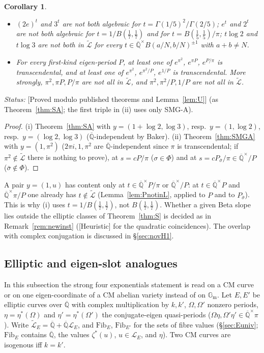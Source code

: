 \documentclass[11pt]{amsart}
\newtheorem{corollary}[theorem]{Corollary}
\theoremstyle{definition}
\newcommand{\Qb}{\overline{\mathbb{Q}}}
\newcommand{\Gm}{\mathbb{G}_{\mathrm m}}
\newcommand{\Lg}{\mathcal{L}}
\newcommand{\Lt}{\widetilde{\mathcal{L}}}
\newcommand{\Fib}{\mathrm{Fib}}
\newcommand{\lab}[1]{\textup{[#1]}}
\newcommand{\LabC}{\lab{Proved modulo published theorems and Lemma~\ref{lem:U}}}
\newcommand{\Status}{\noindent\emph{Status:} }
\begin{document}
\begin{corollary}\label{cor:SA}
\begin{itemize}
\item[(i)] $(2e)^t$ and $3^t$ are not both algebraic for $t=\Gamma(1/5)^2/\Gamma(2/5)$; $e^t$ and $2^t$ are not both
algebraic for $t=1/B(\frac17,\frac17)$ and for $t=B(\frac15,\frac15)/\pi$; $t\log2$ and $t\log3$ are not both in $\Lt$ for
every $t\in\Qb^\times B(a/N,b/N)^{\pm1}$ with $a+b\neq N$.
\item[(ii)] For every first-kind eigen-period $P$, at least one of $e^{\pi^2}$, $e^{\pi P}$, $e^{P/\pi}$ is transcendental,
and at least one of $e^{\pi^2}$, $e^{\pi^2/P}$, $e^{1/P}$ is transcendental. More strongly, $\pi^2,\pi P,P/\pi$ are not all
in $\Lt$, and $\pi^2,\pi^2/P,1/P$ are not all in $\Lt$.
\end{itemize}
\end{corollary}

\Status \LabC{} (as Theorem~\ref{thm:SA}; the first triple in (ii) uses only SMG-A).

\begin{proof}
(i) Theorem~\ref{thm:SA} with $y=(1+\log2,\log3)$, resp.\ $y=(1,\log2)$, resp.\ $y=(\log2,\log3)$ ($\Qb$-independent by
Baker). (ii) Theorem~\ref{thm:SMGA} with $y=(1,\pi^2)$ ($2\pi i,1,\pi^2$ are $\Qb$-independent since $\pi$ is
transcendental; if $\pi^2\notin\Lt$ there is nothing to prove), at $s=cP/\pi$ ($\sigma\in\Phi$) and at
$s=cP_{\bar\sigma}/\pi\in\Qb^\times/P$ ($\bar\sigma\notin\Phi$).
\end{proof}

\noindent A pair $y=(1,u)$ has content only at $t\in\Qb^\times P/\pi$ or $\Qb^\times/P$: at $t\in\Qb^\times P$ and
$\Qb^\times\pi/P$ one already has $t\notin\Lt$ (Lemma~\ref{lem:PnotinL}, applied to $P$ and to $P_{\bar\sigma}$). This is why
(i) uses $t=1/B(\frac17,\frac17)$, not $B(\frac17,\frac17)$. Whether a given Beta slope lies outside the elliptic classes of
Theorem~\ref{thm:S} is decided as in Remark~\ref{rem:newinst} (\lab{Heuristic} for the quadratic coincidences). The overlap
with complex conjugation is discussed in \S\ref{sec:novH1}.

\subsection{Elliptic and eigen-slot analogues}\label{sec:SE}
In this subsection the strong four exponentials statement is read on a CM curve or on one eigen-coordinate of a CM abelian
variety instead of on $\Gm$. Let $E,E'$ be elliptic curves over $\Qb$ with complex multiplication by $k,k'$,
$\Omega,\Omega'$ nonzero periods, $\eta=\eta^*(\Omega)$ and $\eta'=\eta^*(\Omega')$ the conjugate-eigen quasi-periods
($\Omega\eta,\Omega'\eta'\in\Qb^\times\pi$). Write $\Lt_E=\Qb+\Qb\Lg_E$, and $\Fib_E$, $\Fib_{E'}$ for the sets of fibre
values (\S\ref{sec:Euniv}; $\Fib_E$ contains $\Qb$, the values $\zeta^*(u)$, $u\in\Lg_E$, and $\eta$). Two CM curves are
isogenous iff $k=k'$.
\end{document}
